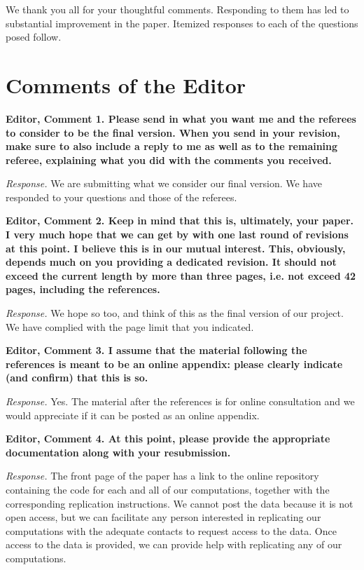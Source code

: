 \restoregeometry
\doublespacing

\noindent We thank you all for your thoughtful comments. Responding to them has led to substantial improvement in the paper. Itemized responses to each of the questions posed follow.

\section*{Comments of the Editor}

\noindent \textbf{Editor, Comment 1. Please send in what you want me and the referees to consider to be the final version. When you send in your revision, make sure to also include a reply to me as well as to the remaining referee, explaining what you did with the comments you received.}

\noindent \textit{Response.} We are submitting what we consider our final version. We have responded to your questions and those of the referees.

\noindent \textbf{Editor, Comment 2. Keep in mind that this is, ultimately, your paper. I very much hope that we can get by with one last round of revisions at this point. I believe this is in our mutual interest. This, obviously, depends much on you providing a dedicated revision. It should not exceed the current length by more than three pages, i.e. not exceed 42 pages, including the references.}

\noindent \textit{Response.} We hope so too, and think of this as the final version of our project. We have complied with the page limit that you indicated.

\noindent \textbf{Editor, Comment 3. I assume that the material following the references is meant to be an online appendix: please clearly indicate (and confirm) that this is so.}

\noindent \textit{Response.} Yes. The material after the references is for online consultation and we would appreciate if it can be posted as an online appendix.

\noindent \textbf{Editor, Comment 4. At this point, please provide the appropriate documentation along with your resubmission.}

\noindent \textit{Response.} The front page of the paper has a link to the online repository containing the code for each and all of our computations, together with the corresponding replication instructions. We cannot post the data because it is not open access, but we can facilitate any person interested in replicating our computations with the adequate contacts to request access to the data. Once access to the data is provided, we can provide help with replicating any of our computations.

